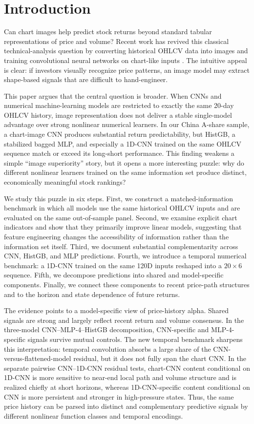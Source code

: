 \section{Introduction}

Can chart images help predict stock returns beyond standard tabular representations of price and volume? Recent work has revived this classical technical-analysis question by converting historical OHLCV data into images and training convolutional neural networks on chart-like inputs \citep{jiang2023reimagining}. The intuitive appeal is clear: if investors visually recognize price patterns, an image model may extract shape-based signals that are difficult to hand-engineer.

This paper argues that the central question is broader. When CNNs and numerical machine-learning models are restricted to exactly the same 20-day OHLCV history, image representation does not deliver a stable single-model advantage over strong nonlinear numerical learners. In our China A-share sample, a chart-image CNN produces substantial return predictability, but HistGB, a stabilized bagged MLP, and especially a 1D-CNN trained on the same OHLCV sequence match or exceed its long-short performance. This finding weakens a simple ``image superiority'' story, but it opens a more interesting puzzle: why do different nonlinear learners trained on the same information set produce distinct, economically meaningful stock rankings?

We study this puzzle in six steps. First, we construct a matched-information benchmark in which all models use the same historical OHLCV inputs and are evaluated on the same out-of-sample panel. Second, we examine explicit chart indicators and show that they primarily improve linear models, suggesting that feature engineering changes the accessibility of information rather than the information set itself. Third, we document substantial complementarity across CNN, HistGB, and MLP predictions. Fourth, we introduce a temporal numerical benchmark: a 1D-CNN trained on the same 120D inputs reshaped into a $20\times 6$ sequence. Fifth, we decompose predictions into shared and model-specific components. Finally, we connect these components to recent price-path structures and to the horizon and state dependence of future returns.

The evidence points to a model-specific view of price-history alpha. Shared signals are strong and largely reflect recent return and volume consensus. In the three-model CNN--MLP-4--HistGB decomposition, CNN-specific and MLP-4-specific signals survive mutual controls. The new temporal benchmark sharpens this interpretation: temporal convolution absorbs a large share of the CNN-versus-flattened-model residual, but it does not fully span the chart CNN. In the separate pairwise CNN--1D-CNN residual tests, chart-CNN content conditional on 1D-CNN is more sensitive to near-end local path and volume structure and is realized chiefly at short horizons, whereas 1D-CNN-specific content conditional on CNN is more persistent and stronger in high-pressure states. Thus, the same price history can be parsed into distinct and complementary predictive signals by different nonlinear function classes and temporal encodings.

